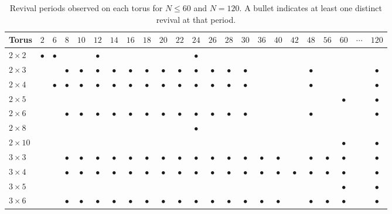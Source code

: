 \begin{table}[htbp]
\centering
\caption{Revival periods observed on each torus for $N \le 60$ and
$N = 120$. A bullet indicates at least one distinct revival at that
period.}
\label{tab:torus-period-n60}
\begin{tabular}{lcccccccccccccccccccccc}
\toprule
Torus & $2$ & $6$ & $8$ & $10$ & $12$ & $14$ & $16$ & $18$ & $20$ & $22$ & $24$ & $26$ & $28$ & $30$ & $36$ & $40$ & $42$ & $48$ & $56$ & $60$ & $\cdots$ & $120$ \\
\midrule
$2\times2$  & $\bullet$ & $\bullet$ &  &  & $\bullet$ &  &  &  &  &  & $\bullet$ &  &  &  &  &  &  &  &  &  &  &  \\
$2\times3$  &  &  & $\bullet$ & $\bullet$ & $\bullet$ & $\bullet$ & $\bullet$ & $\bullet$ & $\bullet$ & $\bullet$ & $\bullet$ & $\bullet$ & $\bullet$ & $\bullet$ &  &  &  & $\bullet$ &  &  &  & $\bullet$ \\
$2\times4$  &  & $\bullet$ & $\bullet$ & $\bullet$ & $\bullet$ & $\bullet$ & $\bullet$ & $\bullet$ & $\bullet$ & $\bullet$ & $\bullet$ & $\bullet$ & $\bullet$ & $\bullet$ &  &  &  & $\bullet$ &  &  &  & $\bullet$ \\
$2\times5$  &  &  &  &  &  &  &  &  &  &  &  &  &  &  &  &  &  &  &  & $\bullet$ &  & $\bullet$ \\
$2\times6$  &  &  & $\bullet$ & $\bullet$ & $\bullet$ & $\bullet$ & $\bullet$ & $\bullet$ & $\bullet$ & $\bullet$ & $\bullet$ & $\bullet$ & $\bullet$ & $\bullet$ &  &  &  & $\bullet$ &  &  &  & $\bullet$ \\
$2\times8$  &  &  &  &  &  &  &  &  &  &  & $\bullet$ &  &  &  &  &  &  &  &  &  &  &  \\
$2\times10$ &  &  &  &  &  &  &  &  &  &  &  &  &  &  &  &  &  &  &  & $\bullet$ &  & $\bullet$ \\
$3\times3$  &  &  & $\bullet$ & $\bullet$ & $\bullet$ & $\bullet$ & $\bullet$ & $\bullet$ & $\bullet$ & $\bullet$ & $\bullet$ & $\bullet$ & $\bullet$ & $\bullet$ & $\bullet$ & $\bullet$ &  & $\bullet$ & $\bullet$ & $\bullet$ &  & $\bullet$ \\
$3\times4$  &  &  & $\bullet$ & $\bullet$ & $\bullet$ & $\bullet$ & $\bullet$ & $\bullet$ & $\bullet$ & $\bullet$ & $\bullet$ & $\bullet$ & $\bullet$ & $\bullet$ & $\bullet$ & $\bullet$ & $\bullet$ & $\bullet$ & $\bullet$ & $\bullet$ &  & $\bullet$ \\
$3\times5$  &  &  &  &  &  &  &  &  &  &  &  &  &  &  &  &  &  &  &  & $\bullet$ &  & $\bullet$ \\
$3\times6$  &  &  & $\bullet$ & $\bullet$ & $\bullet$ & $\bullet$ & $\bullet$ & $\bullet$ & $\bullet$ & $\bullet$ & $\bullet$ & $\bullet$ & $\bullet$ & $\bullet$ & $\bullet$ & $\bullet$ &  & $\bullet$ & $\bullet$ & $\bullet$ &  & $\bullet$ \\

\end{tabular}
\end{table}
